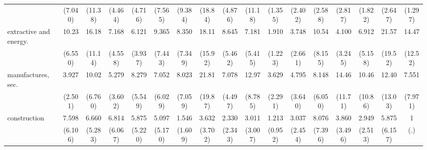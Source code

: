 {\begin{tabular}{l*{16}{c}}
                    &     (7.040)         &     (11.38)         &     (4.464)         &     (4.716)         &     (7.565)         &     (9.384)         &     (18.84)         &     (4.876)         &     (11.18)         &     (1.355)         &     (2.402)         &     (2.588)         &     (2.817)         &     (1.822)         &     (2.647)         &     (1.297)         \\
[1em]
extractive and energy.&       10.23\sym{***}&       16.18\sym{***}&       7.168\sym{**} &       6.121\sym{**} &       9.365\sym{**} &       8.350\sym{*}  &       18.11\sym{***}&       8.645\sym{***}&       7.181\sym{**} &       1.910         &       3.748         &       10.54\sym{**} &       4.100         &       6.912\sym{**} &       21.57\sym{***}&       14.47\sym{**} \\
                    &     (6.550)         &     (11.14)         &     (4.558)         &     (3.937)         &     (7.443)         &     (7.349)         &     (15.92)         &     (5.462)         &     (5.415)         &     (1.223)         &     (2.661)         &     (8.155)         &     (3.245)         &     (5.158)         &     (19.52)         &     (12.52)         \\
[1em]
manufactures, sec.  &       3.927\sym{*}  &       10.02\sym{***}&       5.279\sym{*}  &       8.279\sym{**} &       7.052\sym{*}  &       8.023\sym{*}  &       21.81\sym{***}&       7.078\sym{**} &       12.97\sym{***}&       3.629\sym{*}  &       4.795\sym{*}  &       8.148\sym{**} &       14.46\sym{***}&       10.46\sym{*}  &       12.40\sym{*}  &       7.551         \\
                    &     (2.501)         &     (6.760)         &     (3.602)         &     (5.549)         &     (6.029)         &     (7.059)         &     (19.87)         &     (4.497)         &     (8.785)         &     (2.291)         &     (3.640)         &     (6.050)         &     (11.71)         &     (10.86)         &     (13.03)         &     (7.971)         \\
[1em]
construction        &       7.598\sym{*}  &       6.660\sym{*}  &       6.814\sym{*}  &       5.875\sym{*}  &       5.097         &       1.546         &       3.632         &       2.330         &       3.011         &       1.213         &       3.037         &       8.076\sym{*}  &       3.860         &       2.949         &       5.875         &           1         \\
                    &     (6.106)         &     (5.283)         &     (6.067)         &     (5.220)         &     (5.170)         &     (1.609)         &     (3.702)         &     (2.343)         &     (3.007)         &     (0.952)         &     (2.454)         &     (7.396)         &     (3.496)         &     (2.513)         &     (6.157)         &         (.)         \\

\end{tabular}}
